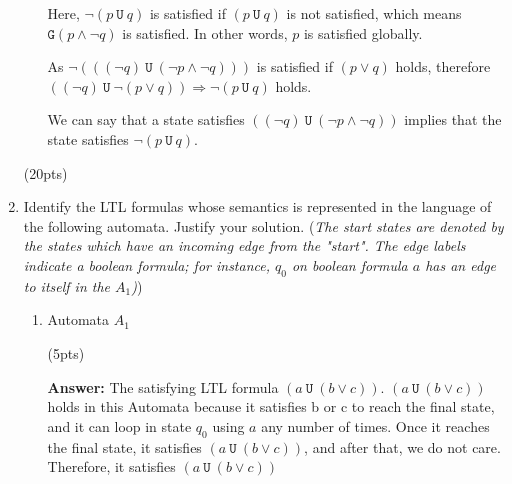 \documentclass[11pt]{article}
\newcommand{\llg}[1]{\texttt{G}(#1)}
\newcommand{\lu}[2]{(#1\ \texttt{U}\ #2)}
\begin{document}
\begin{enumerate}
\begin{enumerate}
Here, $\neg \lu{p}{q}$ is satisfied if $\lu{p}{q}$ is not satisfied, which means $\llg{p \land \neg q}$ is satisfied. In other words, $p$ is satisfied globally. 

As $\neg (\lu{(\neg q)}{(\neg p \land \neg q)})$ is satisfied if $(p \lor q)$ holds, therefore $\lu{(\neg q)}{\neg (p \lor q)}  \Rightarrow \neg \lu{p}{q}$  holds. 

We can say that a state satisfies $\lu{(\neg q)}{(\neg p \land \neg q)} $ implies
    that the state satisfies $\neg \lu{p}{q}$.
 


\end{enumerate}
\hfill(20pts)


\item 
  Identify the LTL formulas whose semantics is represented in the language
  of the following automata. Justify your solution.
  (\emph{The start states are denoted by the states which have an incoming edge
  from the "start". The edge labels indicate a boolean formula; for instance, 
  $q_0$ on boolean formula $a$ has an edge to itself in the $A_1$)})
  \begin{enumerate}
  \item Automata $A_1$
    \begin{center}
        \end{center}
    \hfill(5pts)

    \textbf{Answer:} The satisfying LTL formula $\lu{a}{(b \lor c)}$. 
$\lu{a}{(b \lor c)}$ holds in this Automata because it satisfies b or c to reach the final state, and it can loop in state $q_0$ using $a$ any number of times. Once it reaches the final state, it satisfies $\lu{a}{(b \lor c)}$, and after that, we do not care.  Therefore, it satisfies $\lu{a}{(b \lor c)}$
    

\end{enumerate}
\end{enumerate}
\end{document}
